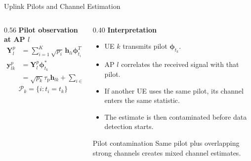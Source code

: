 \documentclass[10pt,aspectratio=169]{beamer}
\newcommand{\taup}{\tau_{\mathrm{p}}}
\newenvironment{tightitemize}{%
    \begin{itemize}
        \setlength{\itemsep}{1pt}
        \setlength{\parskip}{0pt}
        \setlength{\parsep}{0pt}
}{%
    \end{itemize}
}
\begin{document}
\begin{frame}{Uplink Pilots and Channel Estimation}
    \footnotesize
    \begin{columns}[T,onlytextwidth]
        \begin{column}{0.56\textwidth}
            \textbf{Pilot observation at AP $l$}
            \begin{align*}
                \mathbf{Y}_{l}^{p}
                &= \sum_{i=1}^{K}\sqrt{p_i}\,\mathbf{h}_{li}\boldsymbol{\phi}_{t_i}^{T}
                   + \mathbf{N}_{l},\\
                \mathbf{y}_{lk}^{p}
                &= \mathbf{Y}_{l}^{p}\boldsymbol{\phi}_{t_k}^{*}\\
                &= \sqrt{p_k}\taup\mathbf{h}_{lk}
                   + \sum_{i\in\mathcal{P}_k\setminus\{k\}}
                   \sqrt{p_i}\taup\mathbf{h}_{li}
                   + \mathbf{n}_{lk}.
            \end{align*}
            \[
                \mathcal{P}_k=\{i: t_i=t_k\}
            \]
        \end{column}
        \begin{column}{0.40\textwidth}
            \textbf{Interpretation}
            \begin{tightitemize}
                \item UE $k$ transmits pilot $\boldsymbol{\phi}_{t_k}$.
                \item AP $l$ correlates the received signal with that pilot.
                \item If another UE uses the same pilot, its channel enters the same statistic.
                \item The estimate is then contaminated before data detection starts.
            \end{tightitemize}

            \vspace{0.7em}
            \begin{block}{Pilot contamination}
                Same pilot plus overlapping strong channels creates mixed channel estimates.
            \end{block}
        \end{column}
    \end{columns}
\end{frame}
\end{document}

